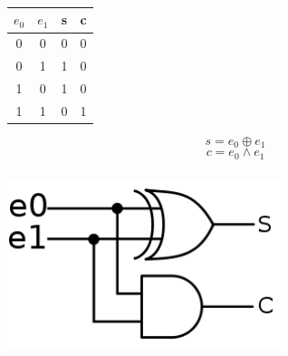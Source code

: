 \documentclass[svgnames,11pt]{beamer}
\begin{document}
\begin{frame}
    \frametitle{}
    \begin{center}
        \begin{tabular}{|cc||cc|}
            \hline 
            $e_0$ & $e_1$ & s & c \\ 
            \hline 
            0 & 0 & 0 & 0 \\ 
            \hline 
            0 & 1 & 1 & 0\\ 
            \hline 
            1 & 0 & 1 & 0\\
            \hline 
            1 & 1 & 0 & 1\\
            \hline 
            \end{tabular}
    \end{center}
    {\Large $$s=e_0\oplus e_1$$
$$c=e_0\land e_1$$}

\end{frame}
\begin{frame}
    \frametitle{}

    \begin{center}
    \centering
    \includegraphics[width=8cm]{ressources/demi-add.png}
    \label{IMG}
    \end{center}

\end{frame}
\end{document}
